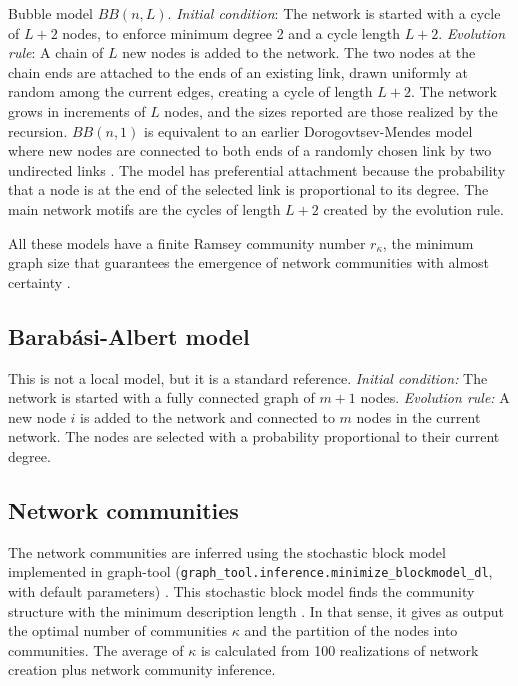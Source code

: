 \documentclass[reprint,aps,pre,amsmath,amssymb,superscriptaddress,showpacs]{revtex4-1}
\begin{document}
Bubble model $BB(n, L)$. {\em Initial condition}: The network is started with a cycle of $L+2$ nodes, to enforce minimum degree 2 and a cycle length $L+2$. {\em Evolution rule}: A chain of $L$ new nodes is added to the network. The two nodes at the chain ends are attached to the ends of an existing link, drawn uniformly at random among the current edges, creating a cycle of length $L+2$. The network grows in increments of $L$ nodes, and the sizes reported are those realized by the recursion. $BB(n, 1)$ is equivalent to an earlier Dorogovtsev-Mendes model where new nodes are connected to both ends of a randomly chosen link by two undirected links \cite{dorogotsev2001link}. The model has preferential attachment because the probability that a node is at the end of the selected link is proportional to its degree. The main network motifs are the cycles of length $L+2$ created by the evolution rule.

All these models have a finite Ramsey community number $r_\kappa$, the minimum graph size that guarantees the emergence of network communities with almost certainty \cite{vazquez2025local}.


\subsection{Barab\'asi-Albert model}

This is not a local model, but it is a standard reference. {\em Initial condition:} The network is started with a fully connected graph of $m+1$ nodes. {\em Evolution rule:} A new node $i$ is added to the network and connected to $m$ nodes in the current network. The nodes are selected with a probability proportional to their current degree.


\subsection{Network communities}

The network communities are inferred using the stochastic block model implemented in graph-tool (\verb|graph_tool.inference.minimize_blockmodel_dl|, with default parameters) \cite{peixoto_graph-tool_2014}. This stochastic block model finds the community structure with the minimum description length \cite{peixoto2024networkreconstructionminimumdescription}. In that sense, it gives as output the optimal number of communities $\kappa$ and the partition of the nodes into communities. The average of $\kappa$ is calculated from 100 realizations of network creation plus network community inference.
\end{document}
